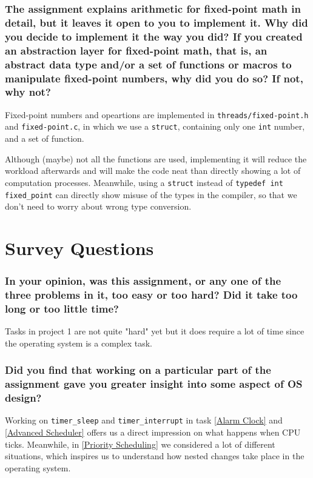 \documentclass[sigconf, nonacm, balance=false, urlbreakonhyphens=true]{acmart}
\begin{document}
            \subsubsection{The assignment explains arithmetic for fixed-point math in detail, but it leaves it open to you to implement it. Why did you decide to implement it the way you did? If you created an abstraction layer for fixed-point math, that is, an abstract data type and/or a set of functions or macros to manipulate fixed-point numbers, why did you do so? If not, why not?}

            Fixed-point numbers and opeartions are implemented in \texttt{threads/fixed-point.h} and \texttt{fixed-point.c}, in which we use a \texttt{struct}, containing only one \texttt{int} number, and a set of function. 
            
            Although (maybe) not all the functions are used, implementing it will reduce the workload afterwards and will make the code neat than directly showing a lot of computation processes. Meanwhile, using a \texttt{struct} instead of \texttt{typedef int fixed\_point} can directly show misuse of the types in the compiler, so that we don't need to worry about wrong type conversion. 
    
    \section{Survey Questions}

        \subsubsection*{In your opinion, was this assignment, or any one of the three problems in it, too easy or too hard? Did it take too long or too little time? }

            Tasks in project 1 are not quite "hard" yet but it does require a lot of time since the operating system is a complex task. 

        \subsubsection*{Did you find that working on a particular part of the assignment gave you greater insight into some aspect of OS design? }

            Working on \texttt{timer\_sleep} and \texttt{timer\_interrupt} in task \ref{Alarm Clock} and \ref{Advanced Scheduler} offers us a direct impression on what happens when CPU ticks. Meanwhile, in \ref{Priority Scheduling} we considered a lot of different situations, which inspires us to understand how nested changes take place in the operating system. 
\end{document}
